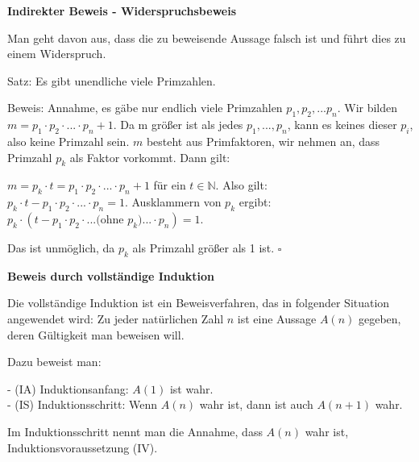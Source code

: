 \begin{frame}[fragile]

\textbf{Indirekter Beweis - Widerspruchsbeweis}

Man geht davon aus, dass die zu beweisende Aussage falsch ist und führt dies zu einem Widerspruch.

Satz: Es gibt unendliche viele Primzahlen. \pause

Beweis: Annahme, es gäbe nur endlich viele Primzahlen \pause $p_1, p_2, ... p_n$. \pause Wir bilden 
$m = p_1 \cdot p_2 \cdot ... \cdot p_n + 1$. \pause Da m größer ist als jedes $p_1,...,p_n$, kann es keines dieser $p_i$, also keine Primzahl sein. \pause $m$ besteht aus Primfaktoren, wir nehmen an, dass Primzahl $p_k$ als Faktor vorkommt. \pause Dann gilt:

\quad $m = p_k \cdot t =  p_1 \cdot p_2 \cdot ... \cdot p_n + 1$ für ein $t \in \mathbb{N}$. \pause Also gilt: \\
\quad $p_k \cdot t - p_1 \cdot p_2 \cdot ... \cdot p_n = 1$. \pause Ausklammern von $p_k$ ergibt: \\  
\quad $p_k \cdot ( t - p_1 \cdot p_2 \cdot ... \text{(ohne $p_k$)} ...\cdot p_n) = 1$. \pause

Das ist unmöglich, da $p_k$ als Primzahl größer als 1 ist. \hfill $\square$

\end{frame}

\begin{frame}[fragile]

\textbf{Beweis durch vollständige Induktion}

 Die vollständige Induktion ist ein Beweisverfahren, das in folgender Situation angewendet wird: 
 Zu jeder natürlichen Zahl $n$ ist eine Aussage
$A(n)$ gegeben, deren Gültigkeit man beweisen will. \pause

Dazu beweist man:

- (IA) Induktionsanfang: $A(1)$ ist wahr. \\ \pause
- (IS) Induktionsschritt: Wenn $A(n)$ wahr ist, dann ist auch $A(n+1)$ wahr. \pause

Im Induktionsschritt nennt man die Annahme, dass $A(n)$ wahr ist, Induktionsvoraussetzung (IV).

\end{frame}

